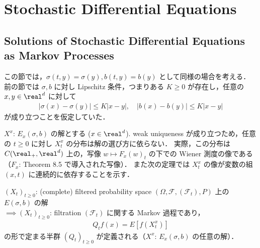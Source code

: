 \documentclass{jsarticle}
\title{}
\author{}
\date{
}
\begin{document}
\setcounter{section}{7}
\section{Stochastic Differential Equations}
\setcounter{subsection}{2}
\subsection{Solutions of Stochastic Differential Equations as Markov Processes}

この節では，$\sigma(t, y)=\sigma(y), b(t, y)=b(y)$ として同様の場合を考える．
前の節では $\sigma, b$ に対し Lipschitz 条件，つまりある $K\ge0$ が存在し，任意の $x, y\in\real^d$ に対して
\begin{align}
    \lvert \sigma(x)-\sigma(y)\rvert \le K\lvert x-y\rvert,\quad
    \lvert b(x)-b(y)\rvert \le K\lvert x-y\rvert
\end{align}
が成り立つことを仮定していた．

$X^x$: $E_x(\sigma, b)$ の解とする ($x\in\real^d$).
weak uniqueness が成り立つため，任意の $t\ge0$ に対し $X_t^x$ の分布は解の選び方に依らない\nazo．
実際，この分布は $C(\real_+, \real^d)$ 上の，写像 $w\mapsto F_x(w)_t$ の下での Wiener 測度の像である（$F_x$: Theorem 8.5 で導入された写像）．
また次の定理では $X_t^x$ の像が変数の組 $(x, t)$ に連続的に依存することを示す．

\setcounter{thm}{5}
\begin{screen}
    \begin{thm}
        $(X_t)_{t\ge0}$: (complete) filtered probability space $(\Omega, \mathcal{F}, (\mathcal{F}_t), P)$ 上の $E(\sigma, b)$ の解 \\
        $\implies (X_t)_{t\ge0}$: filtration $(\mathcal{F}_t)$ に関する Markov 過程であり，
        \begin{align}
            Q_{t}f(x)
            = E[f(X_t^x)]
        \end{align}
        の形で定まる半群 $(Q_t)_{t\ge0}$ が定義される（$X^x$: $E_x(\sigma, b)$ の任意の解）．
    \end{thm}
\end{screen}
\end{document}

